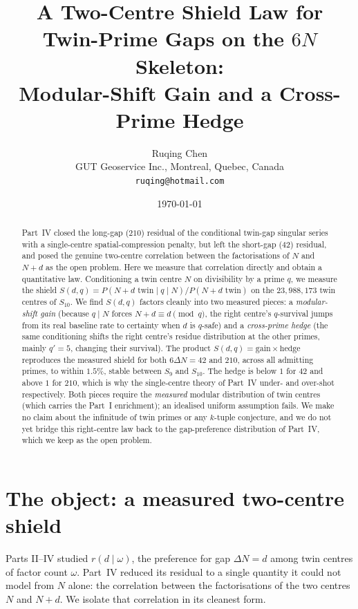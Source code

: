 \documentclass[11pt]{article}
\title{A Two-Centre Shield Law for Twin-Prime Gaps on the $6N$ Skeleton:\\
Modular-Shift Gain and a Cross-Prime Hedge}
\author{Ruqing Chen\\
\small GUT Geoservice Inc., Montreal, Quebec, Canada\\
\small \texttt{ruqing@hotmail.com}}
\date{\today}
\begin{document}
\maketitle

\begin{abstract}
Part~IV closed the long-gap ($210$) residual of the conditional twin-gap
singular series with a single-centre spatial-compression penalty, but left the
short-gap ($42$) residual, and posed the genuine two-centre correlation between
the factorisations of $N$ and $N+d$ as the open problem. Here we measure that
correlation directly and obtain a quantitative law. Conditioning a twin centre
$N$ on divisibility by a prime $q$, we measure the shield
$S(d,q)=P(N{+}d\text{ twin}\mid q\mid N)/P(N{+}d\text{ twin})$ on the
$23{,}988{,}173$ twin centres of $S_{10}$. We find $S(d,q)$ factors cleanly into
two measured pieces: a \emph{modular-shift gain} (because $q\mid N$ forces
$N{+}d\equiv d \pmod q$, the right centre's $q$-survival jumps from its real
baseline rate to certainty when $d$ is $q$-safe) and a \emph{cross-prime hedge}
(the same conditioning shifts the right centre's residue distribution at the
other primes, mainly $q'=5$, changing their survival). The product
$S(d,q)=\text{gain}\times\text{hedge}$ reproduces the measured shield for both
$6\Delta N=42$ and $210$, across all admitting primes, to within $1.5\%$, stable
between $S_9$ and $S_{10}$. The hedge is below $1$ for $42$ and above $1$ for
$210$, which is why the single-centre theory of Part~IV under- and over-shot
respectively. Both pieces require the \emph{measured} modular distribution of
twin centres (which carries the Part~I enrichment); an idealised uniform
assumption fails. We make no claim about the infinitude of twin primes or any
$k$-tuple conjecture, and we do not yet bridge this right-centre law back to the
gap-preference distribution of Part~IV, which we keep as the open problem.
\end{abstract}

\section{The object: a measured two-centre shield}

Parts II--IV studied $r(d\mid\omega)$, the preference for gap $\Delta N=d$ among
twin centres of factor count $\omega$. Part~IV reduced its residual to a single
quantity it could not model from $N$ alone: the correlation between the
factorisations of the two centres $N$ and $N+d$. We isolate that correlation in
its cleanest form.
\end{document}
